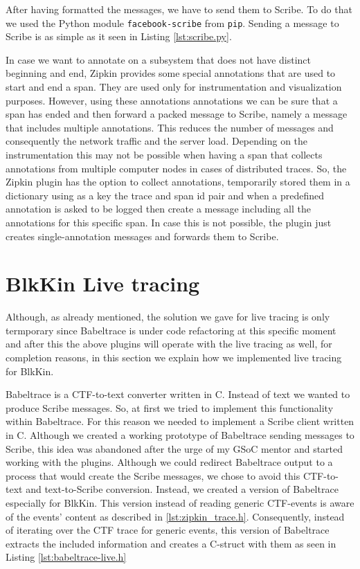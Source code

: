 After having formatted the messages, we have to send them to Scribe. To do that
we used the Python module \texttt{facebook-scribe} from \texttt{pip}. Sending a
message to Scribe is as simple as it seen in Listing \ref{lst:scribe.py}.


In case we want to annotate on a subsystem that does not have distinct beginning
and end, Zipkin provides some special annotations that are used to start and end
a span. They are used only for instrumentation and visualization purposes.
However, using these annotations annotations we can be sure that a span has
ended and then forward a packed message to Scribe, namely a message that
includes multiple annotations. This reduces the number of messages and
consequently the network traffic and the server load. Depending on the
instrumentation this may not be possible when having a span that collects
annotations from multiple computer nodes in cases of distributed traces. So, the
Zipkin plugin has the option to collect annotations, temporarily stored them in
a dictionary using as a key the trace and span id pair and when a predefined
annotation is asked to be logged then create a message including all the
annotations for this specific span. In case this is not possible, the plugin
just creates single-annotation messages and forwards them to Scribe.

\section{BlkKin Live tracing}
Although, as already mentioned, the solution we gave for live tracing is only
termporary since Babeltrace is under code refactoring at this specific moment
and after this the above plugins will operate with the live tracing as well, for
completion reasons, in this section we explain how we implemented live tracing
for BlkKin.

Babeltrace is a CTF-to-text converter written in C. Instead of text we wanted to
produce Scribe messages. So, at first we tried to implement this functionality
within Babeltrace. For this reason we needed to implement a Scribe client
written in C. Although we created a working prototype of Babeltrace sending
messages to Scribe, this idea was abandoned after the urge of my GSoC mentor and
started working with the plugins. Although we could redirect Babeltrace output
to a process that would create the Scribe messages, we chose to avoid this
CTF-to-text and text-to-Scribe conversion. Instead, we created a version of
Babeltrace especially for BlkKin. This version instead of reading generic
CTF-events is aware of the events' content as described in
\ref{lst:zipkin_trace.h}. Consequently, instead of iterating over the CTF trace
for generic events, this version of Babeltrace extracts the included information
and creates a C-struct with them as seen in Listing \ref{lst:babeltrace-live.h} 

